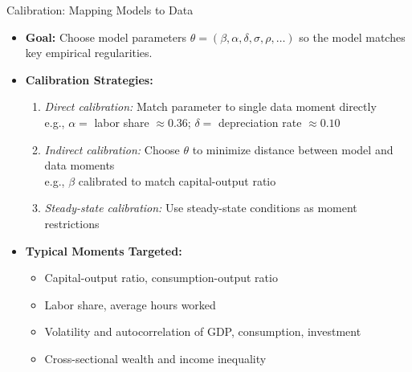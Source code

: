 \begin{frame}{Calibration: Mapping Models to Data}
\begin{itemize}
\item \textbf{Goal:} Choose model parameters $\theta = (\beta, \alpha, \delta, \sigma, \rho, \ldots)$ so the model matches key empirical regularities.

\medskip
\item \textbf{Calibration Strategies:}
\begin{enumerate}
    \item \emph{Direct calibration:} Match parameter to single data moment directly\\
        \quad e.g., $\alpha = $ labor share $\approx 0.36$; $\delta = $ depreciation rate $\approx 0.10$
    \item \emph{Indirect calibration:} Choose $\theta$ to minimize distance between model and data moments\\
        \quad e.g., $\beta$ calibrated to match capital-output ratio
    \item \emph{Steady-state calibration:} Use steady-state conditions as moment restrictions
\end{enumerate}

\medskip
\item \textbf{Typical Moments Targeted:}
\begin{itemize}
    \item Capital-output ratio, consumption-output ratio
    \item Labor share, average hours worked
    \item Volatility and autocorrelation of GDP, consumption, investment
    \item Cross-sectional wealth and income inequality
\end{itemize}
\end{itemize}
\end{frame}

